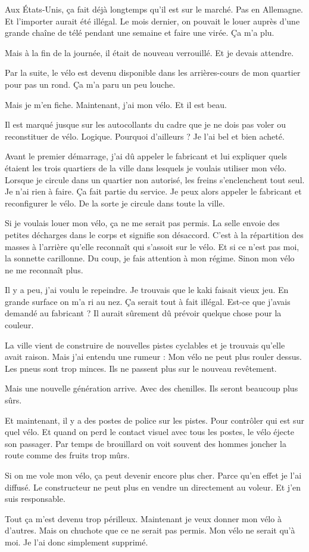 Aux États-Unis, ça fait déjà longtemps qu’il est sur le marché. Pas en Allemagne. Et l'importer aurait été illégal. Le mois dernier, on pouvait le louer auprès d'une grande chaîne de télé pendant une semaine et faire une virée. Ça m'a plu.

Mais à la fin de la journée, il était de nouveau verrouillé. Et je devais attendre.

Par la suite, le vélo est devenu disponible dans les arrières-cours de mon quartier pour pas un rond. Ça m'a paru un peu louche.

Mais je m'en fiche. Maintenant, j'ai mon vélo. Et il est beau.

Il est marqué jusque sur les autocollants du cadre que je ne dois pas voler ou reconstituer de vélo. Logique. Pourquoi d'ailleurs ? Je l'ai bel et bien acheté.

Avant le premier démarrage, j'ai dû appeler le fabricant et lui expliquer quels étaient les trois quartiers de la ville dans lesquels je voulais utiliser mon vélo. Lorsque je circule dans un quartier non autorisé, les freins s'enclenchent tout seul. Je n'ai rien à faire. Ça fait partie du service. Je peux alors appeler le fabricant et reconfigurer le vélo. De la sorte je circule dans toute la ville.

Si je voulais louer mon vélo, ça ne me serait pas permis. La selle envoie des petites décharges dans le corps et signifie son désaccord. C'est à la répartition des masses à l'arrière qu'elle reconnaît qui s'assoit sur le vélo. Et si ce n'est pas moi, la sonnette carillonne. Du coup, je fais attention à mon régime. Sinon mon vélo ne me reconnaît plus.

Il y a peu, j'ai voulu le repeindre. Je trouvais que le kaki faisait vieux jeu. En grande surface on m'a ri au nez. Ça serait tout à fait illégal. Est-ce que j'avais demandé au fabricant ? Il aurait sûrement dû prévoir quelque chose pour la couleur.

La ville vient de construire de nouvelles pistes cyclables et je trouvais qu'elle avait raison. Mais j'ai entendu une rumeur : Mon vélo ne peut plus rouler dessus. Les pneus sont trop minces. Ils ne passent plus sur le nouveau revêtement.

Mais une nouvelle génération arrive. Avec des chenilles. Ils seront beaucoup plus sûrs.

Et maintenant, il y a des postes de police sur les pistes. Pour contrôler qui est sur quel vélo. Et quand on perd le contact visuel avec tous les postes, le vélo éjecte son passager. Par temps de brouillard on voit souvent des hommes joncher la route comme des fruits trop mûrs.

Si on me vole mon vélo, ça peut devenir encore plus cher. Parce qu'en effet je l'ai diffusé. Le constructeur ne peut plus en vendre un directement au voleur. Et j'en suis responsable.

Tout ça m'est devenu trop périlleux. Maintenant je veux donner mon vélo à d'autres. Mais on chuchote que ce ne serait pas permis. Mon vélo ne serait qu'à moi. Je l'ai donc simplement supprimé.
